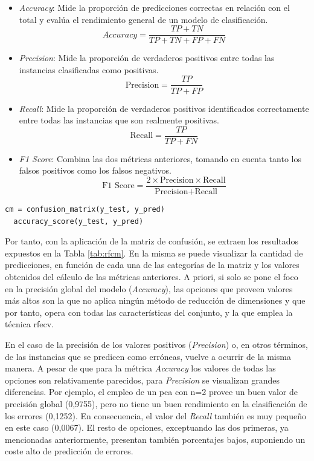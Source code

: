 \begin{itemize}
  \item \textit{Accuracy}: Mide la proporción de predicciones correctas en relación con el total y evalúa el rendimiento general de un modelo de clasificación.
  \[\textit{Accuracy} = \frac{{TP + TN}}{{TP + TN + FP + FN}}\]
  \item \textit{Precision}: Mide la proporción de verdaderos positivos entre todas las instancias clasificadas como positivas.
  \[\text{Precision} = \frac{{TP}}{{TP + FP}}\]
  \item \textit{Recall}: Mide la proporción de verdaderos positivos identificados correctamente entre todas las instancias que son realmente positivas. 
  \[\text{Recall} = \frac{{TP}}{{TP + FN}}\]
  \item \textit{F1 Score}: Combina las dos métricas anteriores, tomando en cuenta tanto los falsos positivos como los falsos negativos.
  \[\text{F1 Score} = \frac{{2 \times \text{Precision} \times \text{Recall}}}{{\text{Precision} + \text{Recall}}}\]
\end{itemize}

\begin{lstlisting}[style=Python, caption={Implementación de la matriz de confusión}]
  cm = confusion_matrix(y_test, y_pred)
  accuracy_score(y_test, y_pred)
\end{lstlisting}

\vspace{3mm}

Por tanto, con la aplicación de la matriz de confusión, se extraen los resultados expuestos en la Tabla \ref{tab:rfcm}. En la misma se puede visualizar la cantidad de predicciones, en función de cada una de las categorías de la matriz y los valores obtenidos del cálculo de las métricas anteriores. A priori, si solo se pone el foco en la precisión global del modelo (\textit{Accuracy}), las opciones que proveen valores más altos son la que no aplica ningún método de reducción de dimensiones y que por tanto, opera con todas las características del conjunto, y la que emplea la técnica \gls{rfecv}. 

\vspace{3mm}

En el caso de la precisión de los valores positivos (\textit{Precision}) o, en otros términos, de las instancias que se predicen como erróneas, vuelve a ocurrir de la misma manera. A pesar de que para la métrica \textit{Accuracy} los valores de todas las opciones son relativamente parecidos, para \textit{Precision} se visualizan grandes diferencias. Por ejemplo, el empleo de un \gls{pca} con n=2 provee un buen valor de precisión global (0,9755), pero no tiene un buen rendimiento en la clasificación de los errores (0,1252). En consecuencia, el valor del \textit{Recall} también es muy pequeño en este caso (0,0067). El resto de opciones, exceptuando las dos primeras, ya mencionadas anteriormente, presentan también porcentajes bajos, suponiendo un coste alto de predicción de errores. 

